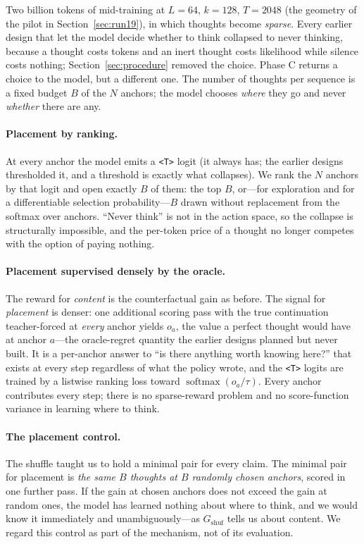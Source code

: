 \documentclass{article} %
\newcommand{\gain}{G}
\newcommand{\tstart}{\texttt{<T>}}
\begin{document}
Two billion tokens of mid-training at $L{=}64$, $k{=}128$, $T{=}2048$ (the geometry of the pilot in Section~\ref{sec:run19}), in which thoughts become \emph{sparse}. Every earlier design that let the model decide whether to think collapsed to never thinking, because a thought costs tokens and an inert thought costs likelihood while silence costs nothing; Section~\ref{sec:procedure} removed the choice. Phase C returns a choice to the model, but a different one. The number of thoughts per sequence is a fixed budget $B$ of the $N$ anchors; the model chooses \emph{where} they go and never \emph{whether} there are any.

\paragraph{Placement by ranking.} At every anchor the model emits a \tstart{} logit (it always has; the earlier designs thresholded it, and a threshold is exactly what collapses). We rank the $N$ anchors by that logit and open exactly $B$ of them: the top $B$, or---for exploration and for a differentiable selection probability---$B$ drawn without replacement from the softmax over anchors. ``Never think'' is not in the action space, so the collapse is structurally impossible, and the per-token price of a thought no longer competes with the option of paying nothing.

\paragraph{Placement supervised densely by the oracle.} The reward for \emph{content} is the counterfactual gain as before. The signal for \emph{placement} is denser: one additional scoring pass with the true continuation teacher-forced at \emph{every} anchor yields $o_a$, the value a perfect thought would have at anchor $a$---the oracle-regret quantity the earlier designs planned but never built. It is a per-anchor answer to ``is there anything worth knowing here?'' that exists at every step regardless of what the policy wrote, and the \tstart{} logits are trained by a listwise ranking loss toward $\operatorname{softmax}(o_a/\tau)$. Every anchor contributes every step; there is no sparse-reward problem and no score-function variance in learning where to think.

\paragraph{The placement control.} The shuffle taught us to hold a minimal pair for every claim. The minimal pair for placement is \emph{the same $B$ thoughts at $B$ randomly chosen anchors}, scored in one further pass. If the gain at chosen anchors does not exceed the gain at random ones, the model has learned nothing about where to think, and we would know it immediately and unambiguously---as $\gain_{\mathrm{shuf}}$ tells us about content. We regard this control as part of the mechanism, not of its evaluation.
\end{document}
